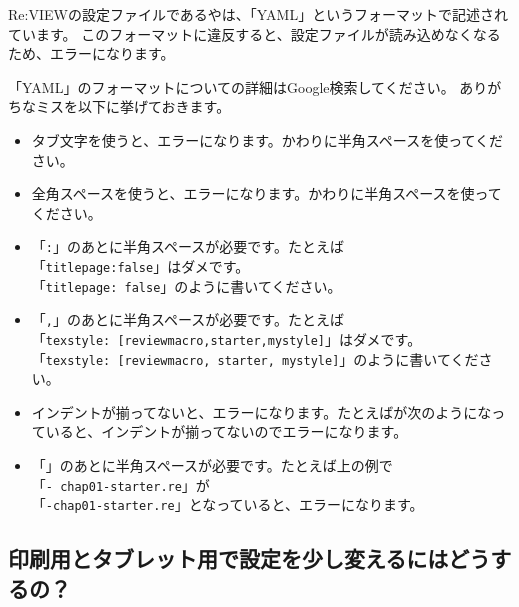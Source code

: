 Re:VIEWの設定ファイルであるやは、「YAML」というフォーマットで記述されています。
このフォーマットに違反すると、設定ファイルが読み込めなくなるため、エラーになります。

「YAML」のフォーマットについての詳細はGoogle検索してください。
ありがちなミスを以下に挙げておきます。

\begin{itemize}
\item タブ文字を使うと、エラーになります。かわりに半角スペースを使ってください。
\item 全角スペースを使うと、エラーになります。かわりに半角スペースを使ってください。
\item 「\texttt{:}」のあとに半角スペースが必要です。たとえば\\
「\texttt{titlepage:false}」はダメです。\\
「\texttt{titlepage: false}」のように書いてください。
\item 「\texttt{,}」のあとに半角スペースが必要です。たとえば\\
「\texttt{texstyle: [reviewmacro,starter,mystyle]}」はダメです。\\
「\texttt{texstyle: [reviewmacro, starter, mystyle]}」のように書いてください。
\item インデントが揃ってないと、エラーになります。たとえばが次のようになっていると、インデントが揃ってないのでエラーになります。
\end{itemize}

\begin{starterprogram}\end{starterprogram}

\begin{itemize}
\item 「\reviewem{{-}}」のあとに半角スペースが必要です。たとえば上の例で\\
「\texttt{{-} chap01{-}starter.re}」が\\
「\texttt{{-}chap01{-}starter.re}」となっていると、エラーになります。
\end{itemize}

\subsection{印刷用とタブレット用で設定を少し変えるにはどうするの？}
\label{sec:2-7-2}

